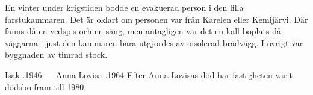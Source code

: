 En vinter under krigstiden bodde en evakuerad person i den lilla farstukammaren. Det är oklart om personen var från Karelen eller Kemijärvi. Där fanns då en vedspis och en säng, men antagligen var det en kall boplats då väggarna i just den kammaren bara utgjordes av oisolerad brädvägg. I övrigt var byggnaden av timrad stock.

Isak .1946  --- Anna-Lovisa .1964
Efter Anna-Lovisas död har fastigheten varit dödsbo fram till 1980.
